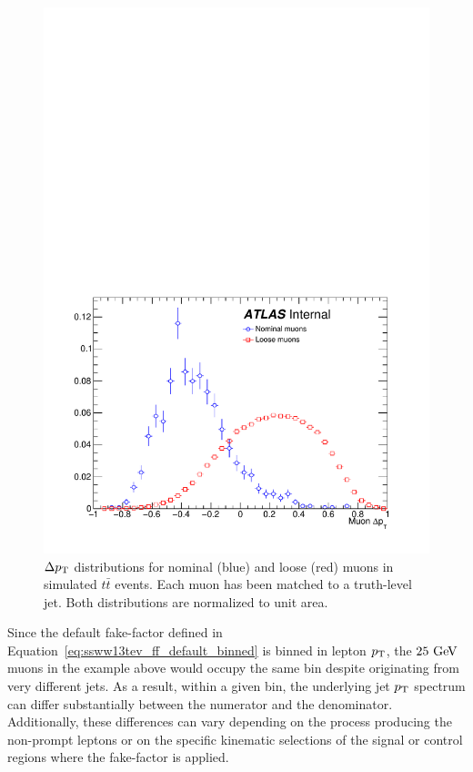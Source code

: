 \begin{figure}[htbp]
  \centering
  \includegraphics[width=.6\textwidth]{figs/ssww_13tev/backgrounds/ff/deltapt_ttbar}
  \caption{$\Delta p_{\mathrm{T}}$ distributions for nominal (blue) and loose (red) muons in simulated $t\bar{t}$ events.  Each muon has been matched to a truth-level jet.  Both distributions are normalized to unit area.}
  \label{fig:ssww13tev_ff_deltapt}
\end{figure}

Since the default fake-factor defined in Equation~\ref{eq:ssww13tev_ff_default_binned} is binned in lepton $p_{\mathrm{T}}$, the $25\gev$ muons in the example above would occupy the same bin despite originating from very different jets.
As a result, within a given bin, the underlying jet $p_{\mathrm{T}}$ spectrum can differ substantially between the numerator and the denominator.
Additionally, these differences can vary depending on the process producing the non-prompt leptons or on the specific kinematic selections of the signal or control regions where the fake-factor is applied.


